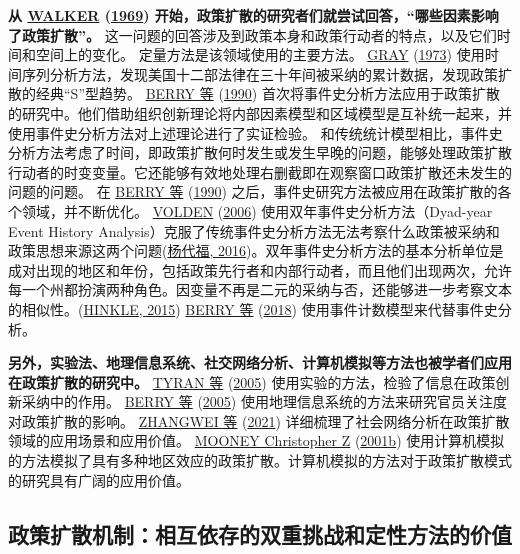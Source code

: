 \documentclass[
  12pt,
]{ctexart}
\begin{document}
\textbf{从 \protect\hyperlink{ref-Walker1969}{WALKER} (\protect\hyperlink{ref-Walker1969}{1969}) 开始，政策扩散的研究者们就尝试回答，``哪些因素影响了政策扩散''。}
这一问题的回答涉及到政策本身和政策行动者的特点，以及它们时间和空间上的变化。
定量方法是该领域使用的主要方法。
\protect\hyperlink{ref-Gray1973}{GRAY} (\protect\hyperlink{ref-Gray1973}{1973}) 使用时间序列分析方法，发现美国十二部法律在三十年间被采纳的累计数据，发现政策扩散的经典``S''型趋势。
\protect\hyperlink{ref-BerryBerry1990}{BERRY 等} (\protect\hyperlink{ref-BerryBerry1990}{1990}) 首次将事件史分析方法应用于政策扩散的研究中。他们借助组织创新理论将内部因素模型和区域模型是互补统一起来，并使用事件史分析方法对上述理论进行了实证检验。
和传统统计模型相比，事件史分析方法考虑了时间，即政策扩散何时发生或发生早晚的问题，能够处理政策扩散行动者的时变变量。它还能够有效地处理右删截即在观察窗口政策扩散还未发生的问题的问题。
在 \protect\hyperlink{ref-BerryBerry1990}{BERRY 等} (\protect\hyperlink{ref-BerryBerry1990}{1990}) 之后，事件史研究方法被应用在政策扩散的各个领域，并不断优化。
\protect\hyperlink{ref-Volden2006}{VOLDEN} (\protect\hyperlink{ref-Volden2006}{2006}) 使用双年事件史分析方法（Dyad-year Event History Analysis）克服了传统事件史分析方法无法考察什么政策被采纳和政策思想来源这两个问题(\protect\hyperlink{ref-YangDaiFu2016}{杨代福, 2016})。双年事件史分析方法的基本分析单位是成对出现的地区和年份，包括政策先行者和内部行动者，而且他们出现两次，允许每一个州都扮演两种角色。因变量不再是二元的采纳与否，还能够进一步考察文本的相似性。(\protect\hyperlink{ref-Hinkle2015}{HINKLE, 2015})
\protect\hyperlink{ref-BerryBerry2018}{BERRY 等} (\protect\hyperlink{ref-BerryBerry2018}{2018}) 使用事件计数模型来代替事件史分析。

\textbf{另外，实验法、地理信息系统、社交网络分析、计算机模拟等方法也被学者们应用在政策扩散的研究中。}
\protect\hyperlink{ref-TyranSausgruber2005}{TYRAN 等} (\protect\hyperlink{ref-TyranSausgruber2005}{2005}) 使用实验的方法，检验了信息在政策创新采纳中的作用。
\protect\hyperlink{ref-BerryBaybeck2005}{BERRY 等} (\protect\hyperlink{ref-BerryBaybeck2005}{2005}) 使用地理信息系统的方法来研究官员关注度对政策扩散的影响。
\protect\hyperlink{ref-ZhangWeiEtAl2021}{ZHANGWEI 等} (\protect\hyperlink{ref-ZhangWeiEtAl2021}{2021}) 详细梳理了社会网络分析在政策扩散领域的应用场景和应用价值。
\protect\hyperlink{ref-Mooney2001a}{MOONEY Christopher Z} (\protect\hyperlink{ref-Mooney2001a}{2001b}) 使用计算机模拟的方法模拟了具有多种地区效应的政策扩散。计算机模拟的方法对于政策扩散模式的研究具有广阔的应用价值。

\hypertarget{ux653fux7b56ux6269ux6563ux673aux5236ux76f8ux4e92ux4f9dux5b58ux7684ux53ccux91cdux6311ux6218ux548cux5b9aux6027ux65b9ux6cd5ux7684ux4ef7ux503c}{%
\subsection{政策扩散机制：相互依存的双重挑战和定性方法的价值}\label{ux653fux7b56ux6269ux6563ux673aux5236ux76f8ux4e92ux4f9dux5b58ux7684ux53ccux91cdux6311ux6218ux548cux5b9aux6027ux65b9ux6cd5ux7684ux4ef7ux503c}}
\end{document}
